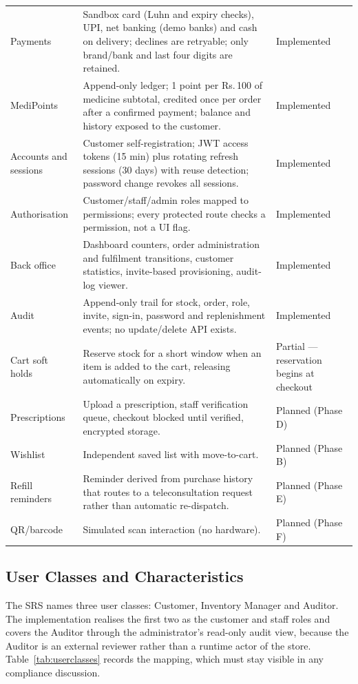 \documentclass[11pt,a4paper]{article}
\providecommand{\rupee}{Rs.\,}
\begin{document}
\begin{longtable}{@{}L{3.00cm}L{9.04cm}L{3.40cm}@{}}
Payments & Sandbox card (Luhn and expiry checks), UPI, net banking (demo banks) and cash on delivery; declines are retryable; only brand/bank and last four digits are retained. & Implemented\\
MediPoints & Append-only ledger; 1 point per \rupee100 of medicine subtotal, credited once per order after a confirmed payment; balance and history exposed to the customer. & Implemented\\
Accounts and sessions & Customer self-registration; JWT access tokens (15 min) plus rotating refresh sessions (30 days) with reuse detection; password change revokes all sessions. & Implemented\\
Authorisation & Customer/staff/admin roles mapped to permissions; every protected route checks a permission, not a UI flag. & Implemented\\
Back office & Dashboard counters, order administration and fulfilment transitions, customer statistics, invite-based provisioning, audit-log viewer. & Implemented\\
Audit & Append-only trail for stock, order, role, invite, sign-in, password and replenishment events; no update/delete API exists. & Implemented\\
Cart soft holds & Reserve stock for a short window when an item is added to the cart, releasing automatically on expiry. & Partial --- reservation begins at checkout\\
Prescriptions & Upload a prescription, staff verification queue, checkout blocked until verified, encrypted storage. & Planned (Phase D)\\
Wishlist & Independent saved list with move-to-cart. & Planned (Phase B)\\
Refill reminders & Reminder derived from purchase history that routes to a teleconsultation request rather than automatic re-dispatch. & Planned (Phase E)\\
QR/barcode & Simulated scan interaction (no hardware). & Planned (Phase F)\\
\end{longtable}

\subsection{User Classes and Characteristics}
The SRS names three user classes: Customer, Inventory Manager and Auditor. The
implementation realises the first two as the customer and staff roles and covers the
Auditor through the administrator's read-only audit view, because the Auditor is an
external reviewer rather than a runtime actor of the store. Table~\ref{tab:userclasses}
records the mapping, which must stay visible in any compliance discussion.
\end{document}
